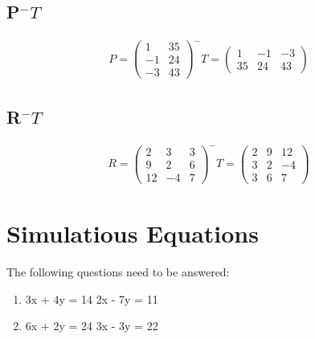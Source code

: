 \documentclass[a4paper,10pt]{article}
\begin{document}
        \subsection{P$^-T$}
          \begin{align*}
            P =
            \begin{pmatrix}
              1 & 35\\
             -1 & 24\\
             -3 & 43
            \end{pmatrix}
            ^-T
             =
            \begin{pmatrix}
               1 & -1 & -3\\
              35 & 24 & 43
            \end{pmatrix}
          \end{align*}

        \subsection{R$^-T$}
          \begin{align*}
            R =
            \begin{pmatrix}
              2 &  3 & 3\\
              9 &  2 & 6\\
             12 & -4 & 7
            \end{pmatrix}
            ^-T
             =
            \begin{pmatrix}
               2 & 9 & 12\\
               3 & 2 & -4\\
               3 & 6 &  7
            \end{pmatrix}
          \end{align*}

    \newpage

    \section{Simulatious Equations}
      The following questions need to be answered:

      \begin{enumerate}
        \item 3x + 4y = 14
              2x - 7y = 11
        \item 6x + 2y = 24
              3x - 3y = 22
      \end{enumerate}
\end{document}
